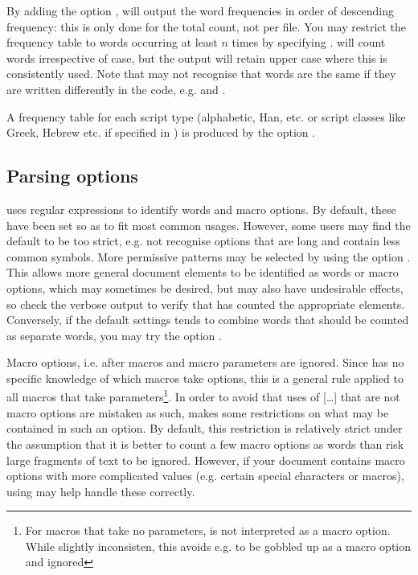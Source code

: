 \documentclass{article}
\begin{document}
By adding the option , \TeXcount{} will output the word frequencies in order of descending frequency: this is only done for the total count, not per file. You may restrict the frequency table to words occurring at least $n$ times by specifying . \TeXcount{} will count words irrespective of case, but the output will retain upper case where this is consistently used. Note that \TeXcount{} may not recognise that words are the same if they are written differently in the code, e.g.  and .

A frequency table for each script type (alphabetic, Han, etc. or script classes like Greek, Hebrew etc. if specified in ) is produced by the option . 


\subsection{Parsing options}

\TeXcount{} uses regular expressions to identify words and macro options. By default, these have been set so as to fit most common usages. However, some users may find the default to be too strict, e.g. not recognise options that are long and contain less common symbols. More permissive patterns may be selected by using the option . This allows more general document elements to be identified as words or macro options, which may sometimes be desired, but may also have undesirable effects, so check the verbose output to verify that \TeXcount{} has counted the appropriate elements. Conversely, if the default settings tends to combine words that should be counted as separate words, you may try the option . 

Macro options, i.e. \code{[\ldots]} after macros and macro parameters are ignored. Since \TeXcount{} has no specific knowledge of which macros take options, this is a general rule applied to all macros that take parameters\footnote{For macros that take no parameters, \code{[\ldots]} is not interpreted as a macro option. While slightly inconsisten, this avoids e.g.  to be gobbled up as a macro option and ignored}. In order to avoid that uses of [\ldots] that are not macro options are mistaken as such, \TeXcount{} makes some restrictions on what may be contained in such an option. By default, this restriction is relatively strict under the assumption that it is better to count a few macro options as words than risk large fragments of text to be ignored. However, if your document contains macro options with more complicated values (e.g. certain special characters or macros), using  may help handle these correctly.
\end{document}
